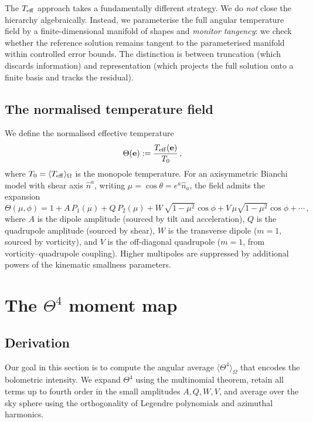 The $T_{\mathrm{eff}}$ approach takes a fundamentally different strategy.
We do \emph{not} close the hierarchy algebraically.  Instead,
we parameterise the full angular temperature field by a
finite-dimensional manifold of shapes and \emph{monitor
tangency}: we check whether the reference solution remains tangent
to the parameterised manifold within controlled error bounds.
The distinction is between truncation (which discards
information) and representation (which projects the full
solution onto a finite basis and tracks the residual).


\subsection{The normalised temperature field}
\label{sec:Theta-field}

We define the normalised effective temperature
\begin{equation}\label{eq:Theta-def}
\Theta(\mathbf{e}) := \frac{T_{\mathrm{eff}}(\mathbf{e})}{T_0}\,,
\end{equation}
where $T_0 = \langle T_{\mathrm{eff}}\rangle_\Omega$ is the monopole
temperature.  For an axisymmetric Bianchi model with shear axis
$\hat{n}^a$, writing $\mu = \cos\theta = e^a\hat{n}_a$, the
field admits the expansion
\begin{equation}\label{eq:Theta-expansion}
\Theta(\mu, \phi)
= 1 + A\,P_1(\mu) + Q\,P_2(\mu)
  + W\,\sqrt{1-\mu^2}\cos\phi
  + V\,\mu\sqrt{1-\mu^2}\cos\phi
  + \cdots\,,
\end{equation}
where $A$ is the dipole amplitude (sourced by tilt and
acceleration), $Q$ is the quadrupole amplitude (sourced by
shear), $W$ is the transverse dipole ($m = 1$, sourced by
vorticity), and $V$ is the off-diagonal quadrupole ($m = 1$,
from vorticity--quadrupole coupling).  Higher multipoles are
suppressed by additional powers of the kinematic smallness
parameters.


\section{The $\Theta^4$ moment map}\label{sec:moment-map}

\subsection{Derivation}\label{sec:F4-derivation}

Our goal in this section is to compute the angular average
$\langle\Theta^4\rangle_\Omega$ that encodes the bolometric
intensity.  We expand $\Theta^4$ using the multinomial theorem,
retain all terms up to fourth order in the small amplitudes
$A, Q, W, V$, and average over the sky sphere using the
orthogonality of Legendre polynomials and azimuthal harmonics.

